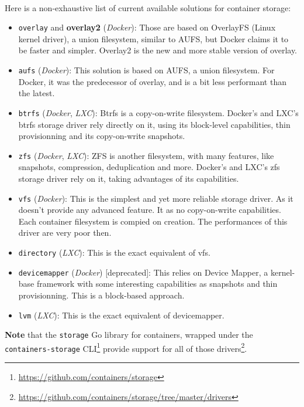 \paragraph{}Here is a non-exhaustive list of current available solutions for container storage:
\begin{itemize}
\renewcommand\labelitemi{--}
  \item \texttt{overlay} and \textbf{overlay2} (\textit{Docker}): Those are based on OverlayFS (Linux kernel driver), a union filesystem, similar to AUFS, but Docker claims it to be faster and simpler.  Overlay2 is the new and more stable version of overlay.
  \item \texttt{aufs} (\textit{Docker}): This solution is based on AUFS, a union filesystem.  For Docker, it was the predecessor of overlay, and is a bit less performant than the latest.
  \item \texttt{btrfs} (\textit{Docker}, \textit{LXC}):  Btrfs is a copy-on-write filesystem.  Docker's and LXC's btrfs storage driver rely directly on it, using its block-level capabilities, thin provisionning and its copy-on-write snapshots.
  \item \texttt{zfs} (\textit{Docker}, \textit{LXC}): ZFS is another filesystem, with many features, like snapshots, compression, deduplication and more.  Docker's and LXC's zfs storage driver rely on it, taking advantages of its capabilities.
  \item \texttt{vfs} (\textit{Docker}):  This is the simplest and yet more reliable storage driver.  As it doesn't provide any advanced feature.  It as no copy-on-write capabilities.  Each container filesystem is compied on creation.  The performances of this driver are very poor then.
  \item \texttt{directory} (\textit{LXC}):  This is the exact equivalent of vfs.
  \item \texttt{devicemapper} (\textit{Docker}) [deprecated]:  This relies on Device Mapper, a kernel-base framework with some interesting capabilities as snapshots and thin provisionning.  This is a block-based approach.
  \item \texttt{lvm} (\textit{LXC}):  This is the exact equivalent of devicemapper.
\end{itemize}

\textbf{Note} that the \texttt{storage} Go library for containers, wrapped under the \texttt{containers-storage} CLI\footnote{\href{https://github.com/containers/storage}{https://github.com/containers/storage}} provide support for all of those drivers\footnote{\href{https://github.com/containers/storage/tree/master/drivers}{https://github.com/containers/storage/tree/master/drivers}}.


